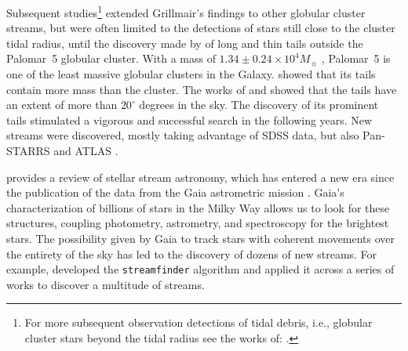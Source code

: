 \documentclass{aa}
\begin{document}
  Subsequent studies\footnote{For more subsequent observation detections of tidal debris, i.e., globular cluster stars beyond the tidal radius see the works of: \citet{1997A&A...320..776L, 2000A&A...356..127T, 2000A&A...359..907L, 2001AAS...19910906S, 2003AJ....126..815L,2011ApJ...726...47S,2018MNRAS.476.4814S,2020MNRAS.495.2222S}.} extended Grillmair's findings to other globular cluster streams, but were often limited to the detections of stars still close to the cluster tidal radius, until the discovery made by \citet{2001ApJ...548L.165O,2002AAS...200.1001O, 2003AJ....126.2385O} of long and thin tails outside the Palomar~5 globular cluster. With a mass of $1.34\pm 0.24 \times 10^4 M_{\sun}$ \citep{2019MNRAS.482.5138B}, Palomar~5 is one of the least massive globular clusters in the Galaxy. \citet{2003AJ....126.2385O} showed that its tails contain more mass than the cluster. The works of \citet{2006ApJ...641L..37G} and \citet{2015MNRAS.446.3297K} showed that the tails have an extent of more than $20^\circ$ degrees in the sky. The discovery of its prominent tails stimulated a vigorous and successful search in the following years. New streams were discovered, mostly taking advantage of SDSS data, but also Pan-STARRS and ATLAS  \citep{2006ApJ...643L..17G, 2006ApJ...637L..29B, 2009ApJ...693.1118G, 2012ApJ...760L...6B, 2013ApJ...769L..23G, 2014ApJ...790L..10G, 2015ApJ...812L..26G, 2014MNRAS.443L..84B, 2016MNRAS.463.1759B, 2017ApJ...847..119G, 2014MNRAS.442L..85K}. 
  
  
  \citet{2025NewAR.10001713B} provides a review of stellar stream astronomy, which has entered a new era since the publication of the data from the Gaia astrometric mission \citep{2016A&A...595A...1G}. Gaia's characterization of billions of stars in the Milky Way allows us to look for these structures, coupling photometry, astrometry, and spectroscopy for the brightest stars. The possibility given by Gaia to track stars with coherent movements over the entirety of the sky has led to the discovery of dozens of new streams. For example, \citet{2018MNRAS.477.4063M} developed the \texttt{streamfinder} algorithm and applied it across a series of works \citep{2018MNRAS.481.3442M,  2018ApJ...865...85I, 2019ApJ...872..152I} to discover a multitude of streams.%
  
\end{document}
